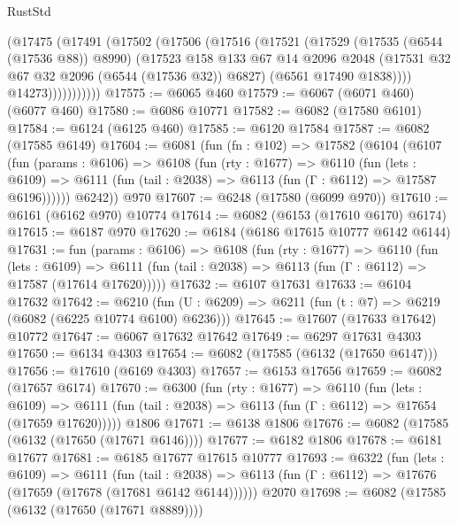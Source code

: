 \begin{lexlean}{RustStd}
\begin{coremodule}
                (@17475
                  (@17491
                    (@17502
                      (@17506
                        (@17516
                          (@17521
                            (@17529
                              (@17535 (@6544 (@17536 @88)) @8990)
                              (@17523
                                @158
                                @133
                                @67
                                @14
                                @2096
                                @2048
                                (@17531 @32 @67 @32 @2096 (@6544 (@17536 @32)) @6827)
                                (@6561 @17490 @1838))))
                          @14273)))))))))))
@17575 := @6065 @460
@17579 := @6067 (@6071 @460) (@6077 @460)
@17580 := @6086 @10771
@17582 := @6082 (@17580 @6101)
@17584 := @6124 (@6125 @460)
@17585 := @6120 @17584
@17587 := @6082 (@17585 @6149)
@17604 := @6081
    (fun (fn : @102) =>
    @17582
      (@6104
        (@6107
          (fun (params : @6106) =>
          @6108
            (fun (rty : @1677) =>
            @6110
              (fun (lets : @6109) =>
              @6111 (fun (tail : @2038) => @6113 (fun (Γ : @6112) => @17587 @6196))))))
        @6242))
    @970
@17607 := @6248 (@17580 (@6099 @970))
@17610 := @6161 (@6162 @970) @10774
@17614 := @6082 (@6153 (@17610 @6170) @6174)
@17615 := @6187 @970
@17620 := @6184 (@6186 @17615 @10777 @6142 @6144)
@17631 := fun (params : @6106) =>
  @6108
    (fun (rty : @1677) =>
    @6110
      (fun (lets : @6109) =>
      @6111 (fun (tail : @2038) => @6113 (fun (Γ : @6112) => @17587 (@17614 @17620)))))
@17632 := @6107 @17631
@17633 := @6104 @17632
@17642 := @6210
    (fun (U : @6209) => @6211 (fun (t : @7) => @6219 (@6082 (@6225 @10774 @6100) @6236)))
@17645 := @17607 (@17633 @17642) @10772
@17647 := @6067 @17632 @17642
@17649 := @6297 @17631 @4303
@17650 := @6134 @4303
@17654 := @6082 (@17585 (@6132 (@17650 @6147)))
@17656 := @17610 (@6169 @4303)
@17657 := @6153 @17656
@17659 := @6082 (@17657 @6174)
@17670 := @6300
    (fun (rty : @1677) =>
    @6110
      (fun (lets : @6109) =>
      @6111 (fun (tail : @2038) => @6113 (fun (Γ : @6112) => @17654 (@17659 @17620)))))
    @1806
@17671 := @6138 @1806
@17676 := @6082 (@17585 (@6132 (@17650 (@17671 @6146))))
@17677 := @6182 @1806
@17678 := @6181 @17677
@17681 := @6185 @17677 @17615 @10777
@17693 := @6322
    (fun (lets : @6109) =>
    @6111
      (fun (tail : @2038) =>
      @6113 (fun (Γ : @6112) => @17676 (@17659 (@17678 (@17681 @6142 @6144))))))
    @2070
@17698 := @6082 (@17585 (@6132 (@17650 (@17671 @8889))))

\end{coremodule}
\end{lexlean}
